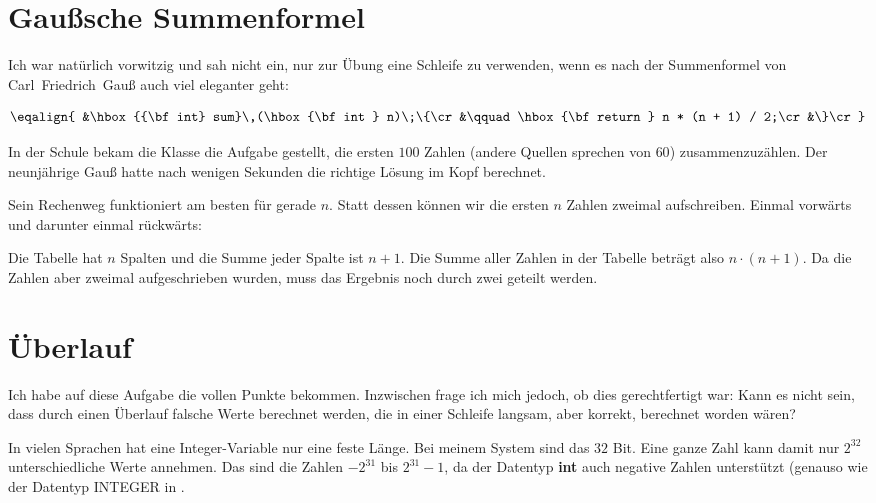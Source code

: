 \section{Gaußsche Summenformel}%
%
Ich war natürlich vorwitzig und sah nicht ein,
nur zur Übung eine Schleife zu verwenden,
wenn es nach der Summenformel von Carl~Friedrich~Gauß auch viel eleganter
geht:

$$\eqalign{
&\hbox{{\bf int} sum}\,(\hbox{\bf int } n)\;\{\cr
&\qquad\hbox{\bf return } n * (n + 1) / 2;\cr
&\}\cr}$$

\noindent In der Schule bekam die Klasse die Aufgabe gestellt, die ersten $100$ Zahlen
(andere Quellen sprechen von $60$) zusammenzuzählen.
Der neunjährige Gauß hatte nach wenigen Sekunden die richtige Lösung im Kopf
berechnet.

Sein Rechenweg funktioniert am besten für gerade $n$.
Statt dessen können wir die ersten $n$ Zahlen zweimal aufschreiben.
Einmal vorwärts und darunter einmal rückwärts:


\noindent Die Tabelle hat $n$ Spalten und die Summe jeder Spalte ist $n+1$.
Die Summe aller Zahlen in der Tabelle beträgt also $n\cdot(n+1)$.
Da die Zahlen aber zweimal aufgeschrieben wurden, muss das
Ergebnis noch durch zwei geteilt werden.

\section{Überlauf}%
%
Ich habe auf diese Aufgabe die vollen Punkte bekommen.
Inzwischen frage ich mich jedoch, ob dies gerechtfertigt war:
Kann es nicht sein, dass durch einen Überlauf falsche Werte
berechnet werden, die in einer Schleife langsam, aber korrekt,
berechnet worden wären?

In vielen Sprachen hat eine Integer-Variable nur eine feste Länge.
Bei meinem System sind das $32$ Bit.
Eine ganze Zahl kann damit nur $2^{32}$ unterschiedliche Werte annehmen.
Das sind die Zahlen $-2^{31}$ bis $2^{31}-1$, da der Datentyp {\bf int}
auch negative Zahlen unterstützt
(genauso wie der Datentyp {\bsf INTEGER}
in \modula.

